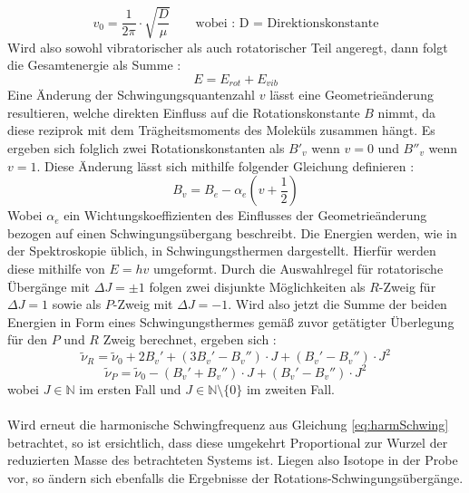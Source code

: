 \begin{equation}
v_0 = \frac{1}{2\pi} \cdot \sqrt{\frac{D}{\mu}} \quad\quad \text{wobei : D = Direktionskonstante}
\label{eq:harmSchwing}
\end{equation}Wird also sowohl vibratorischer als auch rotatorischer Teil angeregt, dann folgt die Gesamtenergie als Summe :
\begin{equation}
E = E_{rot} + E_{vib}
\end{equation}
Eine Änderung der Schwingungsquantenzahl $v$ lässt eine Geometrieänderung resultieren, welche direkten Einfluss auf die Rotationskonstante $B$ nimmt, da diese reziprok mit dem Trägheitsmoments des Moleküls zusammen hängt. Es ergeben sich folglich zwei Rotationskonstanten als $B'_v$ wenn $v=0$ und $B''_v$ wenn $v=1$. Diese Änderung lässt sich mithilfe folgender Gleichung definieren :
\begin{equation}
B_v = B_e - \alpha_e(v+\frac{1}{2})
\end{equation}
Wobei $\alpha_e$ ein Wichtungskoeffizienten des Einflusses der Geometrieänderung bezogen auf einen Schwingungsübergang beschreibt. Die Energien werden, wie in der Spektroskopie üblich, in Schwingungsthermen dargestellt. Hierfür werden diese mithilfe von $E=hv$ umgeformt. Durch die Auswahlregel für rotatorische Übergänge mit $\Delta J = \pm 1$ folgen zwei disjunkte Möglichkeiten als $R$-Zweig für $\Delta J=1$ sowie als $P$-Zweig mit $\Delta J=-1$. Wird also jetzt die Summe der beiden Energien in Form eines Schwingungsthermes gemäß zuvor getätigter Überlegung für den $P$ und $R$ Zweig berechnet, ergeben sich :
\begin{equation}
\tilde{\nu}_R = \tilde{\nu}_0 + 2B_v' + (3B_v'-B_v'')\cdot J +(B_v'-B_v'')\cdot J^2
\end{equation}
\begin{equation}
\tilde{\nu}_P = \tilde{\nu}_0 -(B_v'+ B_v'')\cdot J +(B_v'-B_v'')\cdot J^2
\end{equation}
wobei $J \in \mathbb{N}$ im ersten Fall und $J \in \mathbb{N}\setminus\{0\}$ im zweiten Fall.
\\
\\
Wird erneut die harmonische Schwingfrequenz aus Gleichung \ref{eq:harmSchwing} betrachtet, so ist ersichtlich, dass diese umgekehrt Proportional zur Wurzel der reduzierten Masse des betrachteten Systems ist. Liegen also Isotope in der Probe vor, so ändern sich ebenfalls die Ergebnisse der Rotations-Schwingungsübergänge. \\
\\
%